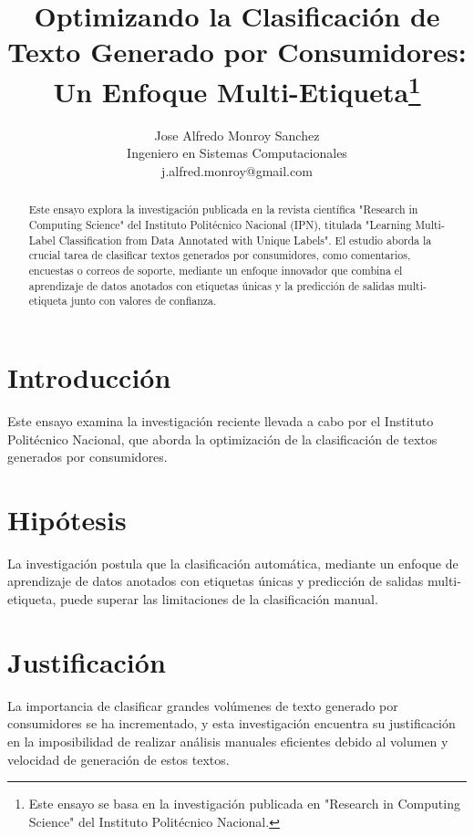 \documentclass[12pt]{article}
\begin{document}
\title{Optimizando la Clasificación de Texto Generado por Consumidores: Un Enfoque Multi-Etiqueta\thanks{Este ensayo se basa en la investigación publicada en "Research in Computing Science" del Instituto Politécnico Nacional.}}

\author{Jose Alfredo Monroy Sanchez\\
Ingeniero en Sistemas Computacionales\\
j.alfred.monroy@gmail.com}

\date{}

\maketitle

\begin{abstract}
  Este ensayo explora la investigación publicada en la revista científica "Research in Computing Science" del Instituto Politécnico Nacional (IPN), titulada "Learning Multi-Label Classification from Data Annotated with Unique Labels". El estudio aborda la crucial tarea de clasificar textos generados por consumidores, como comentarios, encuestas o correos de soporte, mediante un enfoque innovador que combina el aprendizaje de datos anotados con etiquetas únicas y la predicción de salidas multi-etiqueta junto con valores de confianza.
\end{abstract}

\section{Introducción}
Este ensayo examina la investigación reciente llevada a cabo por el Instituto Politécnico Nacional, que aborda la optimización de la clasificación de textos generados por consumidores.

\section{Hipótesis}
La investigación postula que la clasificación automática, mediante un enfoque de aprendizaje de datos anotados con etiquetas únicas y predicción de salidas multi-etiqueta, puede superar las limitaciones de la clasificación manual.

\section{Justificación}
La importancia de clasificar grandes volúmenes de texto generado por consumidores se ha incrementado, y esta investigación encuentra su justificación en la imposibilidad de realizar análisis manuales eficientes debido al volumen y velocidad de generación de estos textos.
\end{document}
